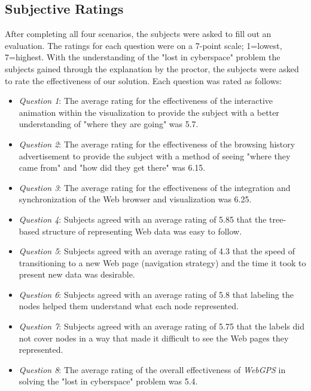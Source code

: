 \documentclass[10pt,psfig]{article}
\begin{document}
{\subsection{Subjective Ratings}
\label{user_study_ratings}

After completing all four scenarios, the subjects were asked to fill out an evaluation.  The ratings for each question were on a 7-point scale; 1=lowest, 7=highest.
With the understanding of the "lost in cyberspace" problem the subjects gained through the explanation by the proctor, the subjects were asked to rate the effectiveness of our solution.
Each question was rated as follows:

\begin{itemize} 

\item {\em Question 1}: The average rating for the effectiveness of the interactive animation within the visualization to provide the subject with a better understanding of "where they are going" was 5.7.

\item {\em Question 2}: The average rating for the effectiveness of the browsing history advertisement to provide the subject with a method of seeing "where they came from" and "how did they get there" was 6.15.

\item {\em Question 3}: The average rating for the effectiveness of the integration and synchronization of the Web browser and visualization was 6.25.

\item {\em Question 4}: Subjects agreed with an average rating of 5.85 that the tree-based structure of representing Web data was easy to follow.

\item {\em Question 5}: Subjects agreed with an average rating of 4.3 that the speed of transitioning to a new Web page (navigation strategy) and the time it took to present new data was desirable.

\item {\em Question 6}: Subjects agreed with an average rating of 5.8 that labeling the nodes helped them understand what each node represented.

\item {\em Question 7}: Subjects agreed with an average rating of 5.75 that the labels did not cover nodes in a way that made it difficult to see the Web pages they represented.

\item {\em Question 8}: The average rating of the overall effectiveness of {\em WebGPS} in solving the "lost in cyberspace" problem was 5.4.


\end{itemize}}
\end{document}
